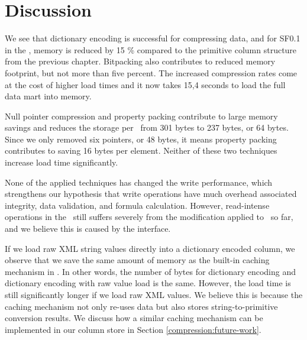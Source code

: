 \section{Discussion}
\label{sec:compression-discussion}
We see that dictionary encoding is successful for compressing data, and for SF0.1 in the \tpchdl, memory is reduced by 15 \% compared to the primitive column structure from the previous chapter. Bitpacking also contributes to reduced memory footprint, but not more than five percent. The increased compression rates come at the cost of higher load times and it now takes 15,4 seconds to load the full data mart into memory.

Null pointer compression and property packing contribute to large memory savings and reduces the storage per \lineitem~from 301 bytes to 237 bytes, or 64 bytes. Since we only removed six pointers, or 48 bytes, it means property packing contributes to saving 16 bytes per element. Neither of these two techniques increase load time significantly.

None of the applied techniques has changed the write performance, which strengthens our hypothesis that write operations have much overhead associated integrity, data validation, and formula calculation. However, read-intense operations in the \tpchdl~still suffers severely from the modification applied to \gap~so far, and we believe this is caused by the  interface.

If we load raw XML string values directly into a dictionary encoded column, we observe that we save the same amount of memory as the built-in caching mechanism in \gap. In other words, the number of bytes for dictionary encoding and dictionary encoding with raw value load is the same. However, the load time is still significantly longer if we load raw XML values. We believe this is because the caching mechanism not only re-uses data but also stores string-to-primitive conversion results. We discuss how a similar caching mechanism can be implemented in our column store in Section \ref{compression:future-work}.

